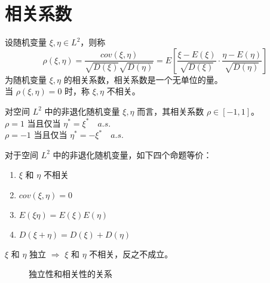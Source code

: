 \documentclass[12pt,a4paper]{amsart}
\begin{document}
\section{相关系数}

\begin{definition}[相关系数]
    设随机变量 $\xi, \eta \in L^2$，则称
    \begin{equation}
        \rho(\xi, \eta) = \frac{cov(\xi, \eta)}{\sqrt{D(\xi)}\sqrt{D(\eta)}} = E\left[\frac{\xi - E(\xi)}{\sqrt{D(\xi)}}\cdot\frac{\eta - E(\eta)}{\sqrt{D(\eta)}}\right]
    \end{equation}
    为随机变量 $\xi, \eta$ 的相关系数，相关系数是一个无单位的量。 \\
    当 $\rho(\xi, \eta) = 0$ 时，称 $\xi, \eta$ 不相关。
\end{definition}

\begin{proposition}[相关系数的范围]
    对空间 $L^2$ 中的非退化随机变量 $\xi, \eta$ 而言，其相关系数 $\rho\in[-1, 1]$。 \\
    $\rho = 1$ 当且仅当 $\eta^* = \xi^* \quad a.s.$ \\
    $\rho = -1$ 当且仅当 $\eta^* = -\xi^* \quad a.s.$
\end{proposition}

\begin{proposition}
    对于空间 $L^2$ 中的非退化随机变量，如下四个命题等价：
    \begin{enumerate}
        \item $\xi$ 和 $\eta$ 不相关
        \item $cov(\xi, \eta) = 0$
        \item $E(\xi\eta) = E(\xi)E(\eta)$
        \item $D(\xi+\eta) = D(\xi) + D(\eta)$
    \end{enumerate}
\end{proposition}

\begin{proposition}[独立性和相关性的关系]
    $\xi$ 和 $\eta$ 独立 $\Rightarrow$ $\xi$ 和 $\eta$ 不相关，反之不成立。
\end{proposition}

\begin{figure}[htbp]
    \centering
    \caption{独立性和相关性的关系}
    \label{fig:venn}
\end{figure}
\end{document}
